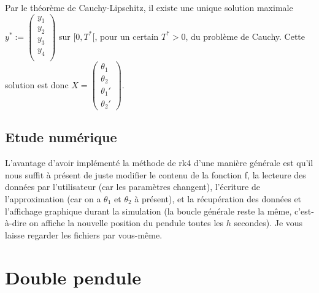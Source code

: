 \documentclass[9pt,a4paper]{article}
\begin{document}
Par le théorème de Cauchy-Lipschitz, il existe une unique solution maximale $y^*:=\begin{pmatrix}
    y_1\\
    y_2 \\
    y_3 \\
    y_4 \\
\end{pmatrix}$ sur $[0,T^*[$, pour un certain $T^* > 0$, du problème de Cauchy. Cette solution est donc $X = \begin{pmatrix}
    \theta_1 \\
    \theta_2 \\
    \theta_1' \\
    \theta_2'
\end{pmatrix}$.\\
\subsection{Etude numérique}
L'avantage d'avoir implémenté la méthode de \gls{rk4} d'une manière générale est qu'il nous suffit à présent de juste modifier le contenu de la fonction f, la lecteure des données par l'utilisateur (car les paramètres changent), l'écriture de l'approximation (car on a $\theta_1$ et $\theta_2$ à présent), et la récupération des données et l'affichage graphique durant la simulation (la boucle générale reste la même, c'est-à-dire on affiche la nouvelle position du pendule toutes les $h$ secondes). Je vous laisse regarder les fichiers par vous-même.
\section{Double pendule}
\end{document}
